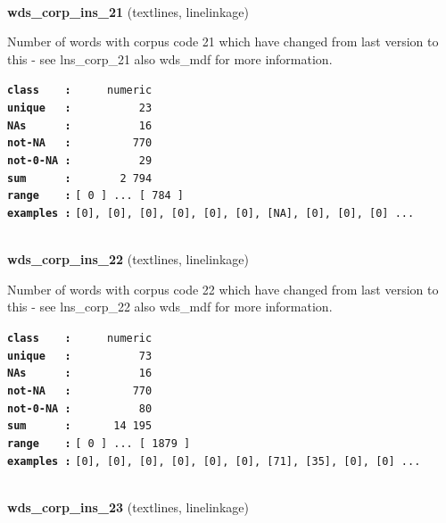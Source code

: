 \documentclass[]{article}
\begin{document}
~

\textbf{wds\_corp\_ins\_21} (textlines, linelinkage)

Number of words with corpus code 21 which have changed from last version
to this - see lns\_corp\_21 also wds\_mdf for more information.

\textbf{\texttt{class\ \ \ \ :}} \texttt{~~~~~numeric}\\
\textbf{\texttt{unique\ \ \ :}} \texttt{~~~~~~~~~~23}\\
\textbf{\texttt{NAs\ \ \ \ \ \ :}} \texttt{~~~~~~~~~~16}\\
\textbf{\texttt{not-NA\ \ \ :}} \texttt{~~~~~~~~~770}\\
\textbf{\texttt{not-0-NA\ :}} \texttt{~~~~~~~~~~29}\\
\textbf{\texttt{sum\ \ \ \ \ \ :}} \texttt{~~~~~~~2~794}\\
\textbf{\texttt{range\ \ \ \ :}}
\texttt{{[}\ 0\ {]}\ ...\ {[}\ 784\ {]}}\\
\textbf{\texttt{examples\ :}}
\texttt{{[}0{]},\ {[}0{]},\ {[}0{]},\ {[}0{]},\ {[}0{]},\ {[}0{]},\ {[}NA{]},\ {[}0{]},\ {[}0{]},\ {[}0{]}\ ...}\\

~

\textbf{wds\_corp\_ins\_22} (textlines, linelinkage)

Number of words with corpus code 22 which have changed from last version
to this - see lns\_corp\_22 also wds\_mdf for more information.

\textbf{\texttt{class\ \ \ \ :}} \texttt{~~~~~numeric}\\
\textbf{\texttt{unique\ \ \ :}} \texttt{~~~~~~~~~~73}\\
\textbf{\texttt{NAs\ \ \ \ \ \ :}} \texttt{~~~~~~~~~~16}\\
\textbf{\texttt{not-NA\ \ \ :}} \texttt{~~~~~~~~~770}\\
\textbf{\texttt{not-0-NA\ :}} \texttt{~~~~~~~~~~80}\\
\textbf{\texttt{sum\ \ \ \ \ \ :}} \texttt{~~~~~~14~195}\\
\textbf{\texttt{range\ \ \ \ :}}
\texttt{{[}\ 0\ {]}\ ...\ {[}\ 1879\ {]}}\\
\textbf{\texttt{examples\ :}}
\texttt{{[}0{]},\ {[}0{]},\ {[}0{]},\ {[}0{]},\ {[}0{]},\ {[}0{]},\ {[}71{]},\ {[}35{]},\ {[}0{]},\ {[}0{]}\ ...}\\

~

\textbf{wds\_corp\_ins\_23} (textlines, linelinkage)
\end{document}
